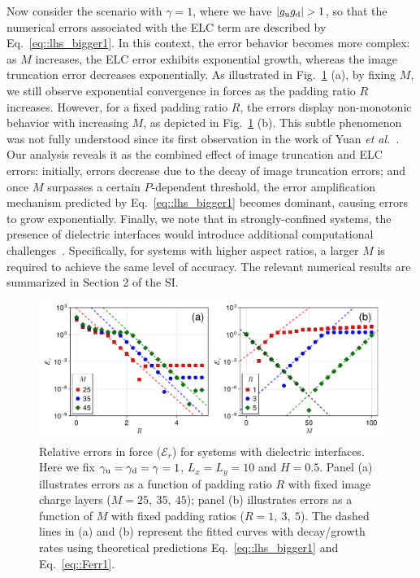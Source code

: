 Now consider the scenario with $\gamma = 1$, where we have $|g_{\text{u}}g_{\text{d}}| > 1$, so that the numerical errors associated with the ELC term are described by Eq.~\eqref{eq::lhs_bigger1}.
In this context, the error behavior becomes more complex: as $M$ increases, the ELC error exhibits exponential growth, whereas the image truncation error decreases exponentially.
As illustrated in Fig.~\ref{fig:error_icm_pad_gamma_1_force} (a), by fixing $M$, we still observe exponential convergence in forces as the padding ratio $R$ increases. 
However, for a fixed padding ratio $R$, the errors display non-monotonic behavior with increasing $M$, as depicted in Fig.~\ref{fig:error_icm_pad_gamma_1_force} (b).
This subtle phenomenon was not fully understood since its first observation in the work of Yuan \emph{et al.}~\cite{yuan2021particle}. 
Our analysis reveals it as the combined effect of image truncation and ELC errors: 
initially, errors decrease due to the decay of image truncation errors; and once $M$ surpasses a certain $P$-dependent threshold, the error amplification mechanism predicted by Eq.~\eqref{eq::lhs_bigger1} becomes dominant, causing errors to grow exponentially.
Finally, we note that in strongly-confined systems, the presence of dielectric interfaces would introduce additional computational challenges~\cite{dos2015electrolytes}. 
Specifically, for systems with higher aspect ratios, a larger $M$ is required to achieve the same level of accuracy. The relevant numerical results are summarized in Section 2 of the SI. 
\begin{figure}[htbp]
    \centering
    \includegraphics[width=0.98\linewidth]{figs/error_icm_pad_gamma_1_force.pdf}
    \caption{Relative errors in force ($\mathcal{E}_r$) for systems with dielectric interfaces. Here we fix $\gamma_{\text{u}}=\gamma_{\text{d}}=\gamma = 1$, $L_x=L_y=10$ and $H = 0.5$. 
    Panel (a) illustrates errors as a function of padding ratio $R$ with fixed image charge layers ($M=25,~35,~45$); panel (b) illustrates errors as a function of $M$ with fixed padding ratios ($R = 1,~3,~5$). The dashed lines in (a) and (b) represent the fitted curves with decay/growth rates using theoretical predictions Eq.~\eqref{eq::lhs_bigger1} and Eq.~\eqref{eq::Ferr1}.}
    \label{fig:error_icm_pad_gamma_1_force}
\end{figure}

